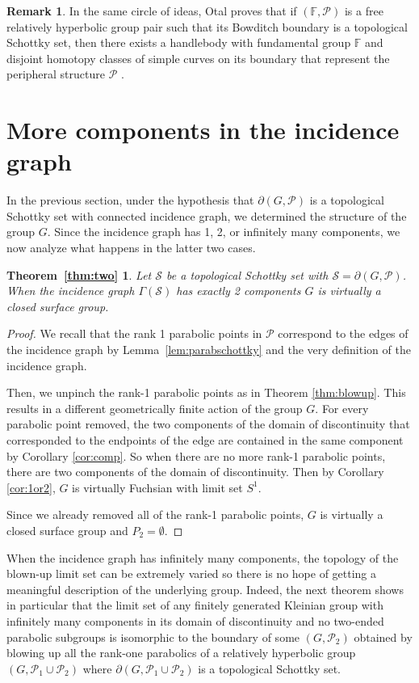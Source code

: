 \documentclass[11pt]{article}
\newtheorem*{thmtwo}{Theorem~\ref{thm:two}}
\theoremstyle{definition}
\newtheorem{remark}[theorem]{Remark}
\newcommand\PP{\mathcal{P}}
\begin{document}
\begin{remark}
In the same circle of ideas, Otal proves that if $(\mathbb{F},\PP)$ is a free relatively hyperbolic group pair such that its Bowditch boundary is a topological Schottky set, then there exists a handlebody with fundamental group $\mathbb{F}$ and disjoint homotopy classes of simple curves on its boundary that represent the peripheral structure $\PP$ \cite{Otal}.
\end{remark}
\section{More components in the incidence graph} \label{sec:more}

In the previous section, under the hypothesis that $\partial(G, \mathcal{P})$ is a topological Schottky set with connected incidence graph, we determined the structure of the group $G$.
Since the incidence graph has 1, 2, or infinitely many components, we now analyze what happens in the latter two cases. 

\begin{thmtwo}  Let $\mathcal{S}$ be a topological Schottky set with $\mathcal{S} = \partial(G, \mathcal{P})$.
When the incidence graph $\Gamma(\mathcal{S})$  has exactly  2 components $G$ is virtually a closed surface group. \end{thmtwo}



\begin{proof} 
We recall that the rank 1 parabolic points in $\mathcal{P}$ correspond to the edges of the incidence graph by Lemma~\ref{lem:parabschottky} and the very definition of the incidence graph. 


Then, we unpinch the rank-1 parabolic points as in Theorem \ref{thm:blowup}.  This results in a different geometrically finite action of the group $G$. For every parabolic point removed, the two components of the domain of discontinuity that corresponded to the endpoints of the edge are contained in the same component by  Corollary \ref{cor:comp}.  So when there are no more rank-1 parabolic points, there are two components of the domain of discontinuity. Then by Corollary \ref{cor:1or2}, $G$ is virtually Fuchsian with limit set $S^1$. 

Since we already removed all of the rank-1 parabolic points, 
$G$ is virtually a closed surface group and $P_2 = \emptyset$. 
\end{proof} 

When the incidence graph has infinitely many components, the topology of the blown-up limit set can be extremely varied so there is no hope of getting a meaningful description of the underlying group. 
Indeed, the next theorem shows in particular that the limit set of any finitely generated Kleinian group with infinitely many components in its 
domain of discontinuity and no two-ended parabolic subgroups is isomorphic to the boundary of some $(G,\mathcal P_2)$ obtained by blowing up all the rank-one parabolics of a relatively hyperbolic group $(G,\mathcal P_1\cup \mathcal P_2)$ where $\partial(G,\mathcal P_1\cup \mathcal P_2)$ is a topological Schottky set. 
\end{document}
